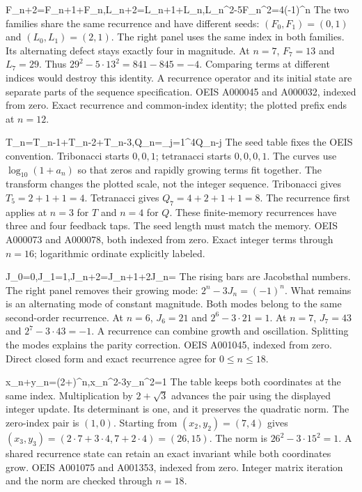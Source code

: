 {F_{n+2}=F_{n+1}+F_n,\quad L_{n+2}=L_{n+1}+L_n,\quad L_n^2-5F_n^2=4(-1)^n}
{The two families share the same recurrence and have different seeds: $(F_0,F_1)=(0,1)$ and $(L_0,L_1)=(2,1)$. The right panel uses the same index in both families. Its alternating defect stays exactly four in magnitude.}
{At $n=7$, $F_7=13$ and $L_7=29$. Thus $29^2-5\cdot13^2=841-845=-4$. Comparing terms at different indices would destroy this identity.}
{A recurrence operator and its initial state are separate parts of the sequence specification.}
{OEIS A000045 and A000032, indexed from zero. Exact recurrence and common-index identity; the plotted prefix ends at $n=12$.}

{T_n=T_{n-1}+T_{n-2}+T_{n-3},\qquad Q_n=\sum_{j=1}^{4}Q_{n-j}}
{The seed table fixes the OEIS convention. Tribonacci starts $0,0,1$; tetranacci starts $0,0,0,1$. The curves use $\log_{10}(1+a_n)$ so that zeros and rapidly growing terms fit together. The transform changes the plotted scale, not the integer sequence.}
{Tribonacci gives $T_5=2+1+1=4$. Tetranacci gives $Q_7=4+2+1+1=8$. The recurrence first applies at $n=3$ for $T$ and $n=4$ for $Q$.}
{These finite-memory recurrences have three and four feedback taps. The seed length must match the memory.}
{OEIS A000073 and A000078, both indexed from zero. Exact integer terms through $n=16$; logarithmic ordinate explicitly labeled.}

{J_0=0,\quad J_1=1,\quad J_{n+2}=J_{n+1}+2J_n=}
{The rising bars are Jacobsthal numbers. The right panel removes their growing mode: $2^n-3J_n=(-1)^n$. What remains is an alternating mode of constant magnitude. Both modes belong to the same second-order recurrence.}
{At $n=6$, $J_6=21$ and $2^6-3\cdot21=1$. At $n=7$, $J_7=43$ and $2^7-3\cdot43=-1$.}
{A recurrence can combine growth and oscillation. Splitting the modes explains the parity correction.}
{OEIS A001045, indexed from zero. Direct closed form and exact recurrence agree for $0\le n\le18$.}

{x_n+y_n=(2+)^n,\qquad x_n^2-3y_n^2=1}
{The table keeps both coordinates at the same index. Multiplication by $2+\sqrt3$ advances the pair using the displayed integer update. Its determinant is one, and it preserves the quadratic norm. The zero-index pair is $(1,0)$.}
{Starting from $(x_2,y_2)=(7,4)$ gives $(x_3,y_3)=(2\cdot7+3\cdot4,7+2\cdot4)=(26,15)$. The norm is $26^2-3\cdot15^2=1$.}
{A shared recurrence state can retain an exact invariant while both coordinates grow.}
{OEIS A001075 and A001353, indexed from zero. Integer matrix iteration and the norm are checked through $n=18$.}

